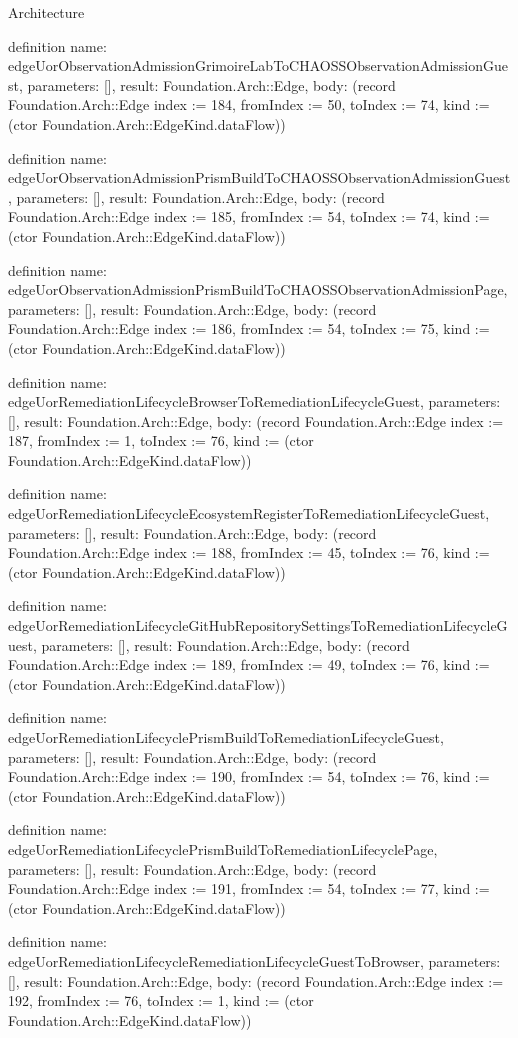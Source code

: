 \begin{lexlean}{Architecture}
\begin{semanticmodule}
definition{
  name: edgeUorObservationAdmissionGrimoireLabToCHAOSSObservationAdmissionGuest,
  parameters: [],
  result: Foundation.Arch::Edge,
  body: (record Foundation.Arch::Edge {index := 184, fromIndex := 50, toIndex := 74, kind := (ctor Foundation.Arch::EdgeKind.dataFlow)})
}

definition{
  name: edgeUorObservationAdmissionPrismBuildToCHAOSSObservationAdmissionGuest,
  parameters: [],
  result: Foundation.Arch::Edge,
  body: (record Foundation.Arch::Edge {index := 185, fromIndex := 54, toIndex := 74, kind := (ctor Foundation.Arch::EdgeKind.dataFlow)})
}

definition{
  name: edgeUorObservationAdmissionPrismBuildToCHAOSSObservationAdmissionPage,
  parameters: [],
  result: Foundation.Arch::Edge,
  body: (record Foundation.Arch::Edge {index := 186, fromIndex := 54, toIndex := 75, kind := (ctor Foundation.Arch::EdgeKind.dataFlow)})
}

definition{
  name: edgeUorRemediationLifecycleBrowserToRemediationLifecycleGuest,
  parameters: [],
  result: Foundation.Arch::Edge,
  body: (record Foundation.Arch::Edge {index := 187, fromIndex := 1, toIndex := 76, kind := (ctor Foundation.Arch::EdgeKind.dataFlow)})
}

definition{
  name: edgeUorRemediationLifecycleEcosystemRegisterToRemediationLifecycleGuest,
  parameters: [],
  result: Foundation.Arch::Edge,
  body: (record Foundation.Arch::Edge {index := 188, fromIndex := 45, toIndex := 76, kind := (ctor Foundation.Arch::EdgeKind.dataFlow)})
}

definition{
  name: edgeUorRemediationLifecycleGitHubRepositorySettingsToRemediationLifecycleGuest,
  parameters: [],
  result: Foundation.Arch::Edge,
  body: (record Foundation.Arch::Edge {index := 189, fromIndex := 49, toIndex := 76, kind := (ctor Foundation.Arch::EdgeKind.dataFlow)})
}

definition{
  name: edgeUorRemediationLifecyclePrismBuildToRemediationLifecycleGuest,
  parameters: [],
  result: Foundation.Arch::Edge,
  body: (record Foundation.Arch::Edge {index := 190, fromIndex := 54, toIndex := 76, kind := (ctor Foundation.Arch::EdgeKind.dataFlow)})
}

definition{
  name: edgeUorRemediationLifecyclePrismBuildToRemediationLifecyclePage,
  parameters: [],
  result: Foundation.Arch::Edge,
  body: (record Foundation.Arch::Edge {index := 191, fromIndex := 54, toIndex := 77, kind := (ctor Foundation.Arch::EdgeKind.dataFlow)})
}

definition{
  name: edgeUorRemediationLifecycleRemediationLifecycleGuestToBrowser,
  parameters: [],
  result: Foundation.Arch::Edge,
  body: (record Foundation.Arch::Edge {index := 192, fromIndex := 76, toIndex := 1, kind := (ctor Foundation.Arch::EdgeKind.dataFlow)})
}


\end{semanticmodule}
\end{lexlean}
